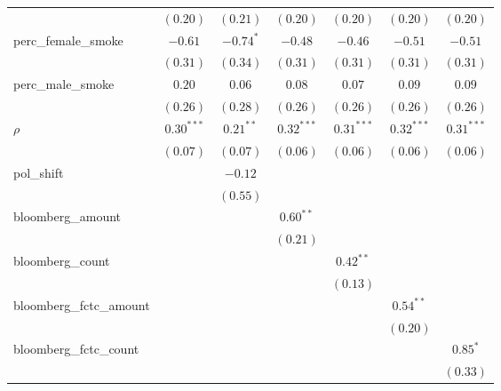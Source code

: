 \begin{table}[!h]
\begin{center}
\begin{tabular}{l c c c c c c }
                        & $(0.20)$     & $(0.21)$    & $(0.20)$     & $(0.20)$     & $(0.20)$     & $(0.20)$     \\
perc\_female\_smoke     & $-0.61$      & $-0.74^{*}$ & $-0.48$      & $-0.46$      & $-0.51$      & $-0.51$      \\
                        & $(0.31)$     & $(0.34)$    & $(0.31)$     & $(0.31)$     & $(0.31)$     & $(0.31)$     \\
perc\_male\_smoke       & $0.20$       & $0.06$      & $0.08$       & $0.07$       & $0.09$       & $0.09$       \\
                        & $(0.26)$     & $(0.28)$    & $(0.26)$     & $(0.26)$     & $(0.26)$     & $(0.26)$     \\
$\rho$                  & $0.30^{***}$ & $0.21^{**}$ & $0.32^{***}$ & $0.31^{***}$ & $0.32^{***}$ & $0.31^{***}$ \\
                        & $(0.07)$     & $(0.07)$    & $(0.06)$     & $(0.06)$     & $(0.06)$     & $(0.06)$     \\
pol\_shift              &              & $-0.12$     &              &              &              &              \\
                        &              & $(0.55)$    &              &              &              &              \\
bloomberg\_amount       &              &             & $0.60^{**}$  &              &              &              \\
                        &              &             & $(0.21)$     &              &              &              \\
bloomberg\_count        &              &             &              & $0.42^{**}$  &              &              \\
                        &              &             &              & $(0.13)$     &              &              \\
bloomberg\_fctc\_amount &              &             &              &              & $0.54^{**}$  &              \\
                        &              &             &              &              & $(0.20)$     &              \\
bloomberg\_fctc\_count  &              &             &              &              &              & $0.85^{*}$   \\
                        &              &             &              &              &              & $(0.33)$     \\

\end{tabular}
\end{center}
\end{table}
